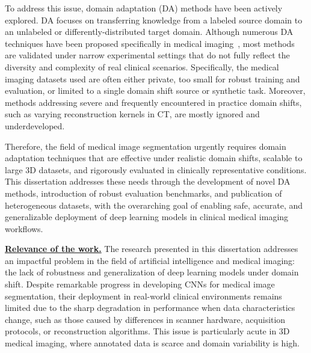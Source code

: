 To address this issue, domain adaptation (DA) methods have been actively explored. DA focuses on transferring knowledge from a labeled source domain to an unlabeled or differently-distributed target domain. Although numerous DA techniques have been proposed specifically in medical imaging~\cite{gulrajani2020search,uda_survey_2020,zhuang2020comprehensive,peng2018visda,zhang2021empirical}, most methods are validated under narrow experimental settings that do not fully reflect the diversity and complexity of real clinical scenarios. Specifically, the medical imaging datasets used are often either private, too small for robust training and evaluation, or limited to a single domain shift source or synthetic task. Moreover, methods addressing severe and frequently encountered in practice domain shifts, such as varying reconstruction kernels in CT, are mostly ignored and underdeveloped.

Therefore, the field of medical image segmentation urgently requires domain adaptation techniques that are effective under realistic domain shifts, scalable to large 3D datasets, and rigorously evaluated in clinically representative conditions. This dissertation addresses these needs through the development of novel DA methods, introduction of robust evaluation benchmarks, and publication of heterogeneous datasets, with the overarching goal of enabling safe, accurate, and generalizable deployment of deep learning models in clinical medical imaging workflows.


\underline{\textbf{Relevance of the work.}}
The research presented in this dissertation addresses an impactful problem in the field of artificial intelligence and medical imaging: the lack of robustness and generalization of deep learning models under domain shift. Despite remarkable progress in developing CNNs for medical image segmentation, their deployment in real-world clinical environments remains limited due to the sharp degradation in performance when data characteristics change, such as those caused by differences in scanner hardware, acquisition protocols, or reconstruction algorithms. This issue is particularly acute in 3D medical imaging, where annotated data is scarce and domain variability is high.

